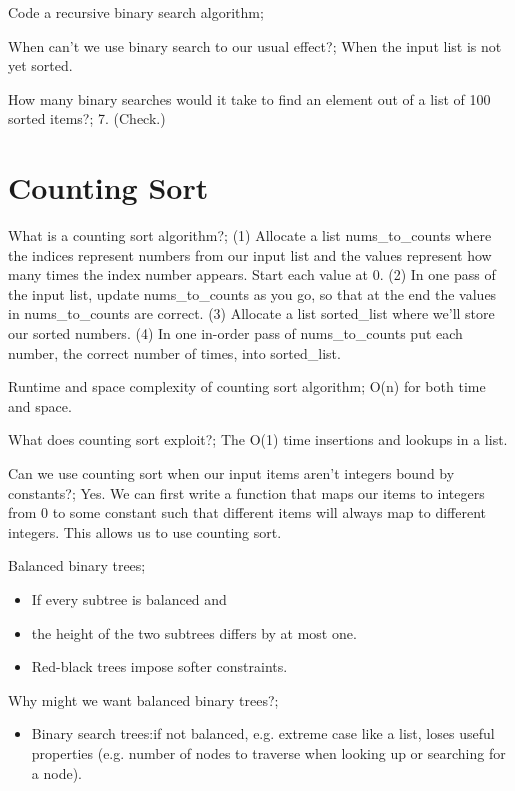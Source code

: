 \documentclass{article}
\begin{document}
Code a recursive binary search algorithm; 

When can’t we use binary search to our usual effect?; When the input list is not yet sorted.

How many binary searches would it take to find an element out of a list of 100 sorted items?; 7. (Check.)

\section{Counting Sort}

What is a counting sort algorithm?; (1) Allocate a list nums\_to\_counts where the indices represent numbers from our input list and the values represent how many times the index number appears. Start each value at 0. (2) In one pass of the input list, update nums\_to\_counts as you go, so that at the end the values in nums\_to\_counts are correct. (3) Allocate a list sorted\_list where we'll store our sorted numbers. (4) In one in-order pass of nums\_to\_counts put each number, the correct number of times, into sorted\_list.

Runtime and space complexity of counting sort algorithm; O(n) for both time and space.

What does counting sort exploit?; The O(1) time insertions and lookups in a list.

Can we use counting sort when our input items aren’t integers bound by constants?; Yes. We can first write a function that maps our items to integers from 0 to some constant such that different items will always map to different integers. This allows us to use counting sort.

Balanced binary trees; \begin{itemize} \item If every subtree is balanced and \item the height of the two subtrees differs by at most one.  \item Red-black trees impose softer constraints.  \end{itemize}

Why might we want balanced binary trees?; \begin{itemize} \item Binary search trees:if not balanced, e.g. extreme case like a list, loses useful properties (e.g. number of nodes to traverse when looking up or searching for a node).
\end{itemize}

\end{document}
